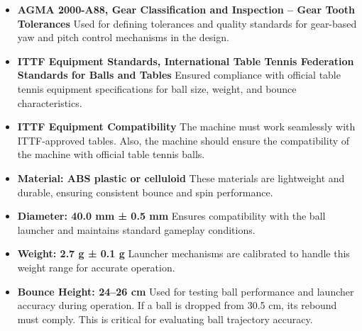 \documentclass[12pt]{report}
\begin{document}
\begin{itemize}
    \item \textbf{AGMA 2000-A88, Gear Classification and Inspection – Gear Tooth Tolerances}\cite{AGMA2000-A88}
    Used for defining tolerances and quality standards for gear-based yaw and pitch control mechanisms in the design.
    
    \item \textbf{ITTF Equipment Standards, International Table Tennis Federation Standards for Balls and Tables}\cite{ITTF}
    Ensured compliance with official table tennis equipment specifications for ball size, weight, and bounce characteristics.
    
    \item \textbf{ITTF Equipment Compatibility}\cite{ITTF}
    The machine must work seamlessly with ITTF-approved tables. Also, the machine should ensure the compatibility of the machine with official table tennis balls.
    
    \item \textbf{Material: ABS plastic or celluloid}
    These materials are lightweight and durable, ensuring consistent bounce and spin performance.
    
    \item \textbf{Diameter: 40.0 mm ± 0.5 mm}
    Ensures compatibility with the ball launcher and maintains standard gameplay conditions.
    
    \item \textbf{Weight: 2.7 g ± 0.1 g}
    Launcher mechanisms are calibrated to handle this weight range for accurate operation.
    
    \item \textbf{Bounce Height: 24–26 cm}
    Used for testing ball performance and launcher accuracy during operation. If a ball is dropped from 30.5 cm, its rebound must comply. This is critical for evaluating ball trajectory accuracy.
\end{itemize}
\end{document}
